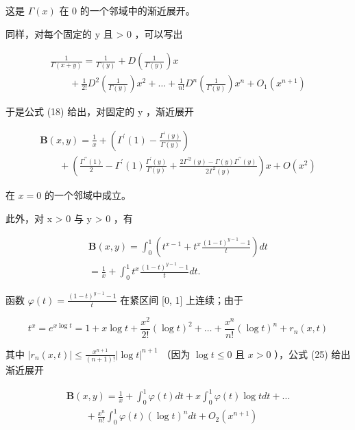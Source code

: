 这是 \(\Gamma(x)\) 在 0 的一个邻域中的渐近展开。

同样，对每个固定的 y 且 \textgreater{} 0 ，可以写出

\[
\begin{array}{l} \frac {1}{\Gamma (x + y)} = \frac {1}{\Gamma (y)} + D \left(\frac {1}{\Gamma (y)}\right) x \\ \qquad + \frac {1}{2 !} D ^ {2} \left(\frac {1}{\Gamma (y)}\right) x ^ {2} + \dots + \frac {1}{n !} D ^ {n} \left(\frac {1}{\Gamma (y)}\right) x ^ {n} + O _ {1} (x ^ {n + 1}) \end{array}
\]

于是公式 (18) 给出，对固定的 y ，渐近展开

\[
\begin{array}{l} \mathbf {B} (x, y) = \frac {1}{x} + \left(\Gamma^ {\prime} (1) - \frac {\Gamma^ {\prime} (y)}{\Gamma (y)}\right) \\ \qquad + \left(\frac {\Gamma^ {\prime \prime} (1)}{2} - \Gamma^ {\prime} (1) \frac {\Gamma^ {\prime} (y)}{\Gamma (y)} + \frac {2 \Gamma^ {\prime 2} (y) - \Gamma (y) \Gamma^ {\prime \prime} (y)}{2 \Gamma^ {2} (y)}\right) x + O (x ^ {2}) \end{array}\tag{24}
\]

在 \(x = 0\) 的一个邻域中成立。

此外，对 x \textgreater{} 0 与 y \textgreater{} 0 ，有

\[
\begin{array}{l} \mathbf {B} (x, y) = \int_ {0} ^ {1} \left(t ^ {x - 1} + t ^ {x} \frac {(1 - t) ^ {y - 1} - 1}{t}\right) d t \\ = \frac {1}{x} + \int_ {0} ^ {1} t ^ {x} \frac {(1 - t) ^ {y - 1} - 1}{t} d t. \end{array}\tag{25}
\]

函数 \(\varphi(t) = \frac{(1 - t)^{y - 1} - 1}{t}\) 在紧区间 {[}0, 1{]} 上连续；由于

\[
t ^ {x} = e ^ {x \log t} = 1 + x \log t + \frac {x ^ {2}}{2 !} (\log t) ^ {2} + \dots + \frac {x ^ {n}}{n !} (\log t) ^ {n} + r _ {n} (x, t)
\]

其中 \(|r_n(x,t)| \leqslant \frac{x^{n+1}}{(n+1)!} |\log t|^{n+1}\) （因为 \(\log t \leqslant 0\) 且 \(x > 0\) ），公式 (25) 给出渐近展开

\[
\begin{array}{l} \mathbf {B} (x, y) = \frac {1}{x} + \int_ {0} ^ {1} \varphi (t) d t + x \int_ {0} ^ {1} \varphi (t) \log t d t + \dots \\ \qquad + \frac {x ^ {n}}{n !} \int_ {0} ^ {1} \varphi (t) (\log t) ^ {n} d t + O _ {2} (x ^ {n + 1}) \end{array}
\]

